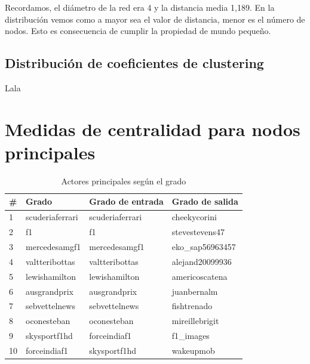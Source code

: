 Recordamos, el diámetro de la red era 4 y la distancia media 1,189. En la distribución vemos como a mayor sea el valor de distancia, menor es el número de nodos. Esto es consecuencia de cumplir la propiedad de mundo pequeño.

\subsection{Distribución de coeficientes de clustering}

Lala

\section{Medidas de centralidad para nodos principales}

\begin{table}[H]
	\centering
	\caption{Actores principales según el grado}
	\label{actores-principales-grado}
	\begin{tabular}{| l | l l l |}
		\hline
		\#      & Grado           & Grado de entrada & Grado de salida  \\
		\hline
		1       & scuderiaferrari & scuderiaferrari  & cheekycorini     \\
		2       & f1              & f1               & stevestevens47   \\
		3       & mercedesamgf1   & mercedesamgf1    & eko\_sap56963457 \\
		4       & valtteribottas  & valtteribottas   & alejand20099936  \\
		5       & lewishamilton   & lewishamilton    & americoscatena   \\
		6       & ausgrandprix    & ausgrandprix     & juanbernalm      \\
		7       & sebvettelnews   & sebvettelnews    & fishtrenado      \\
		8       & oconesteban     & oconesteban      & mireillebrigit   \\
		9       & skysportf1hd    & forceindiaf1     & f1\_images       \\
		10      & forceindiaf1    & skysportf1hd     & wakeupmob        \\
		\hline
	\end{tabular}
\end{table}


